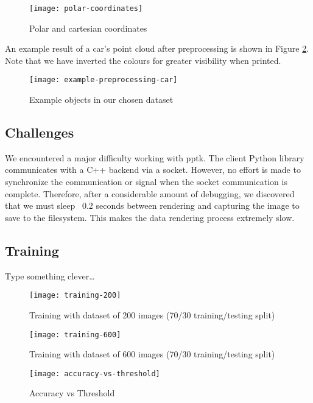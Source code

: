 \documentclass[runningheads,a4paper]{llncs}
\begin{document}
\begin{figure}[h]
  \caption{Polar and cartesian coordinates}
  \centering
  \texttt{[image: polar-coordinates]}
  \label{fig:polar-coordinates}
\end{figure}

An example result of a car’s point cloud after preprocessing is shown in Figure
\ref{fig:example-preprocessing}. Note that we have inverted the colours for greater
visibility when printed.

\begin{figure}[h]
  \caption{Example objects in our chosen dataset}
  \centering
  \texttt{[image: example-preprocessing-car]}
  \label{fig:example-preprocessing}
\end{figure}

\subsection{Challenges}
We encountered a major difficulty working with pptk. The client Python library
communicates with a C++ backend via a socket. However, no effort is made to
synchronize the communication or signal when the socket communication is
complete. Therefore, after a considerable amount of debugging, we discovered
that we must sleep ~0.2 seconds between rendering and capturing the image to
save to the filesystem. This makes the data rendering process extremely slow.

\subsection{Training}
Type something clever\dots

\begin{figure}[h]
  \caption{Training with dataset of 200 images (70/30 training/testing split)}
  \centering
  \texttt{[image: training-200]}
  \label{fig:training-200}
\end{figure}

\begin{figure}[h]
  \caption{Training with dataset of 600 images (70/30 training/testing split)}
  \centering
  \texttt{[image: training-600]}
  \label{fig:training-600}
\end{figure}

\begin{figure}[h]
  \caption{Accuracy vs Threshold}
  \centering
  \texttt{[image: accuracy-vs-threshold]}
  \label{fig:accuracy-vs-threshold}
\end{figure}
\end{document}
